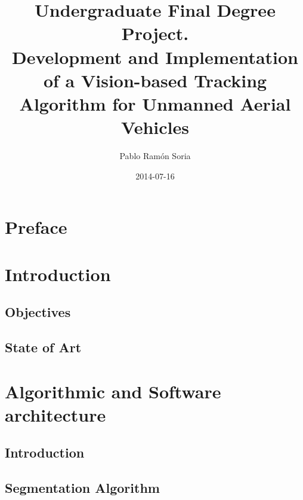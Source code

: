 \documentclass[11pt, oneside]{book} %
\begin{document}
\frontmatter
\title{Undergraduate Final Degree Project. \\ Development and Implementation of a Vision-based Tracking Algorithm for Unmanned Aerial Vehicles}
\author{Pablo Ram\'on Soria}
\date{2014-07-16}
\maketitle

\tableofcontents

\chapter{Preface}


\chapter{Introduction}
\section{Objectives}


\section{State of Art}

\mainmatter


\chapter{Algorithmic and Software architecture}
\section{Introduction}


\section{Segmentation Algorithm}

\end{document}
